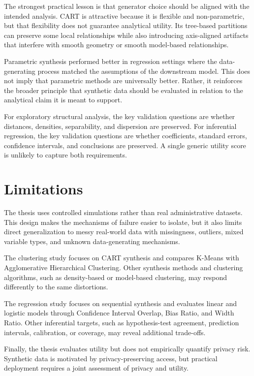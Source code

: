The strongest practical lesson is that generator choice should be aligned with the intended analysis. CART is attractive because it is flexible and non-parametric, but that flexibility does not guarantee analytical utility. Its tree-based partitions can preserve some local relationships while also introducing axis-aligned artifacts that interfere with smooth geometry or smooth model-based relationships.

Parametric synthesis performed better in regression settings where the data-generating process matched the assumptions of the downstream model. This does not imply that parametric methods are universally better. Rather, it reinforces the broader principle that synthetic data should be evaluated in relation to the analytical claim it is meant to support.

For exploratory structural analysis, the key validation questions are whether distances, densities, separability, and dispersion are preserved. For inferential regression, the key validation questions are whether coefficients, standard errors, confidence intervals, and conclusions are preserved. A single generic utility score is unlikely to capture both requirements.

\section{Limitations}
\label{sec:general-limitations}

The thesis uses controlled simulations rather than real administrative datasets. This design makes the mechanisms of failure easier to isolate, but it also limits direct generalization to messy real-world data with missingness, outliers, mixed variable types, and unknown data-generating mechanisms.

The clustering study focuses on CART synthesis and compares K-Means with Agglomerative Hierarchical Clustering. Other synthesis methods and clustering algorithms, such as density-based or model-based clustering, may respond differently to the same distortions.

The regression study focuses on sequential synthesis and evaluates linear and logistic models through Confidence Interval Overlap, Bias Ratio, and Width Ratio. Other inferential targets, such as hypothesis-test agreement, prediction intervals, calibration, or coverage, may reveal additional trade-offs.

Finally, the thesis evaluates utility but does not empirically quantify privacy risk. Synthetic data is motivated by privacy-preserving access, but practical deployment requires a joint assessment of privacy and utility.

